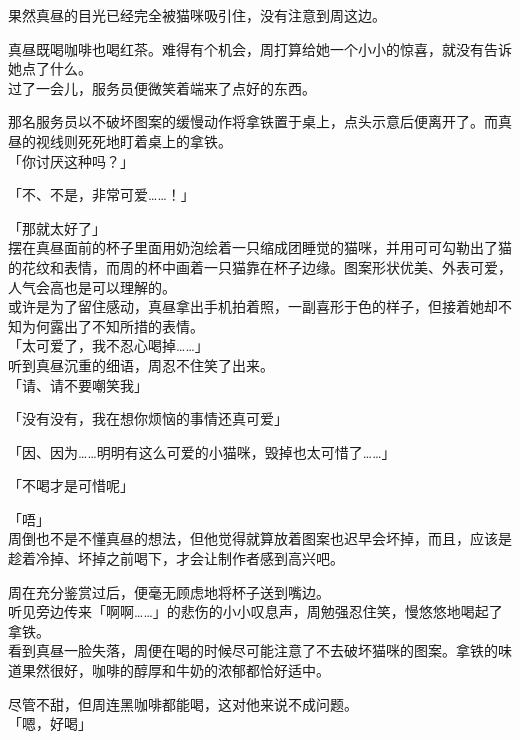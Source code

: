 果然真昼的目光已经完全被猫咪吸引住，没有注意到周这边。

真昼既喝咖啡也喝红茶。难得有个机会，周打算给她一个小小的惊喜，就没有告诉她点了什么。\\

过了一会儿，服务员便微笑着端来了点好的东西。

那名服务员以不破坏图案的缓慢动作将拿铁置于桌上，点头示意后便离开了。而真昼的视线则死死地盯着桌上的拿铁。\\

「你讨厌这种吗？」

「不、不是，非常可爱……！」

「那就太好了」\\

摆在真昼面前的杯子里面用奶泡绘着一只缩成团睡觉的猫咪，并用可可勾勒出了猫的花纹和表情，而周的杯中画着一只猫靠在杯子边缘。图案形状优美、外表可爱，人气会高也是可以理解的。\\

或许是为了留住感动，真昼拿出手机拍着照，一副喜形于色的样子，但接着她却不知为何露出了不知所措的表情。\\

「太可爱了，我不忍心喝掉……」\\

听到真昼沉重的细语，周忍不住笑了出来。\\

「请、请不要嘲笑我」

「没有没有，我在想你烦恼的事情还真可爱」

「因、因为……明明有这么可爱的小猫咪，毁掉也太可惜了……」

「不喝才是可惜呢」

「唔」\\

周倒也不是不懂真昼的想法，但他觉得就算放着图案也迟早会坏掉，而且，应该是趁着冷掉、坏掉之前喝下，才会让制作者感到高兴吧。

周在充分鉴赏过后，便毫无顾虑地将杯子送到嘴边。\\

听见旁边传来「啊啊……」的悲伤的小小叹息声，周勉强忍住笑，慢悠悠地喝起了拿铁。\\

看到真昼一脸失落，周便在喝的时候尽可能注意了不去破坏猫咪的图案。拿铁的味道果然很好，咖啡的醇厚和牛奶的浓郁都恰好适中。

尽管不甜，但周连黑咖啡都能喝，这对他来说不成问题。\\

「嗯，好喝」\\

